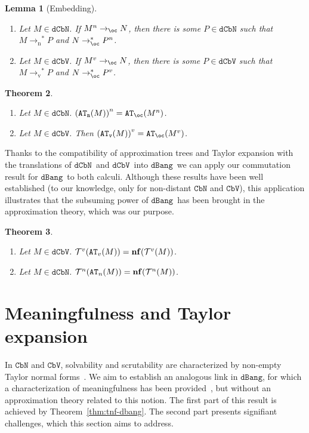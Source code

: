 \documentclass[10pt,a4paper]{article}
\newtheorem{theorem}{Theorem}
\newtheorem{lemma}[theorem]{Lemma}
\newcommand{\<}{\langle}
\renewcommand{\>}{\rangle}
\newcommand{\dcbn}{\ensuremath{\mathtt{dCbN}}}
\newcommand{\cbn}{\ensuremath{\mathtt{CbN}}}
\newcommand{\dcbv}{\ensuremath{\mathtt{dCbV}}}
\newcommand{\cbv}{\ensuremath{\mathtt{CbV}}}
\newcommand{\dbang}{\ensuremath{\mathtt{dBang}}}
\newcommand{\nf}[1]{\mathbf{nf}(#1)}
\newcommand{\ton}{\ensuremath{\to_{\text{n}}}}
\newcommand{\tov}{\ensuremath{\to_{\text{v}}}}
\newcommand{\todbf}{\to_{\oc}} %
\newcommand{\tradv}[1]{\ensuremath{{#1}^v}}
\newcommand{\tradn}[1]{\ensuremath{{#1}^n}}
\newcommand{\taylorn}[1]{\ensuremath{\mathcal{T}^n(#1)}}
\newcommand{\taylorv}[1]{\ensuremath{\mathcal{T}^v(#1)}}
\newcommand{\bt}{\ensuremath{{\tt{AT}}}}
\newcommand{\btb}{\ensuremath{{\tt{AT}_\oc}}}
\newcommand{\btn}{\ensuremath{{\tt{AT}_n}}}
\newcommand{\btv}{\ensuremath{{\tt{AT}_v}}}
\begin{document}
\begin{lemma}[Embedding]~\label{lem:trad_embedding}
	\begin{enumerate}
		\item Let $M\in\dcbn$. If $\tradn M\todbf N$, then there is some
			$P\in\dcbn$ such that $M\ton^* P$ and $N\todbf^*\tradn
			P$.
		\item Let $M\in\dcbv$. If $\tradv M\todbf N$, then there is some
			$P\in\dcbv$ such that $M\tov^* P$ and $N\todbf^*\tradv
			P$.
	\end{enumerate}
\end{lemma}



\begin{theorem}~\label{thm:bohm-trad}
	\begin{enumerate}
		\item Let $M\in \dcbn$. $\tradn{(\btn(M))} = \btb(\tradn M)$.
		\item Let $M\in\dcbv$. Then $\tradv{(\btv(M))} = \btb(\tradv M)$.
	\end{enumerate}
\end{theorem}


Thanks to the compatibility of approximation trees and Taylor expansion with the
translations of \dcbn\ and \dcbv\ into \dbang\, we can
apply our commutation result for \dbang\ to both calculi. Although these results
have been well established (to our knowledge, only for non-distant \cbn{}
and \cbv{}), this application illustrates
 that the subsuming power of \dbang\ has been brought in the
approximation theory, which was our purpose. 

\begin{theorem}~
	\label{commutation-thm-translations}
	\begin{enumerate}
		\item Let $M\in\dcbv$. $\taylorv{\bt_v(M)}=\nf{\taylorv M}$.
		\item Let $M\in\dcbn$. $\taylorn{\bt_n(M)}=\nf{\taylorn M}$.
	\end{enumerate}
\end{theorem}



\section{Meaningfulness and Taylor expansion}\label{sec:meaningfulness}
In \cbn{} and \cbv{}, solvability and scrutability are characterized by non-empty Taylor normal forms~\cite{ER08,CG14}.
We aim to establish an analogous link in \dbang, for which a characterization of
meaningfulness has been provided~\cite{kag24}, but without an approximation theory related
to this notion. The first part of this result is achieved by
Theorem~\ref{thm:tnf-dbang}. The
second part presents signifiant challenges, which  this section aims to
address. 
\end{document}
